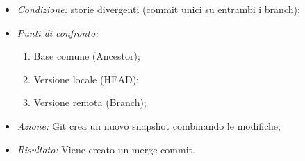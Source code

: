 \documentclass[12pt]{article}
\begin{document}
\begin{itemize}
        \begin{itemize}
          \item \textit{Condizione:} storie divergenti (commit unici su entrambi i branch);
          \item \textit{Punti di confronto:}
            \begin{enumerate}
              \item Base comune (Ancestor);
              \item Versione locale (HEAD);
              \item Versione remota (Branch);
            \end{enumerate}
          \item \textit{Azione:} Git crea un nuovo snapshot combinando le modifiche;
          \item \textit{Risultato:} Viene creato un merge commit.
        \end{itemize}
    \end{itemize}
\end{document}
